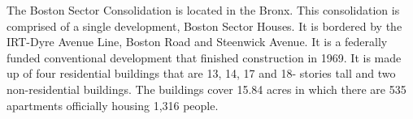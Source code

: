 The Boston Sector Consolidation is located in the Bronx. This consolidation is comprised of a single development, Boston Sector Houses. It is bordered by the IRT-Dyre Avenue Line, Boston Road and Steenwick Avenue. It is a federally funded conventional development that finished construction in 1969. It is made up of four residential buildings that are 13, 14, 17 and 18- stories tall and two non-residential buildings. The buildings cover 15.84 acres in which there are 535 apartments officially housing 1,316 people.